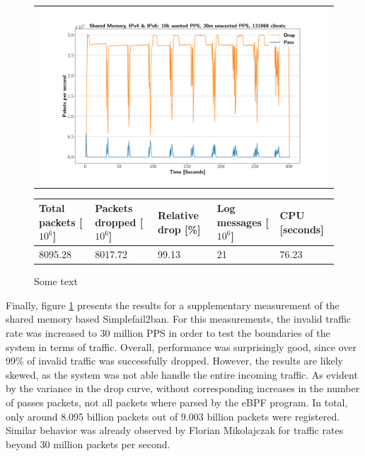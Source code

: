 \pagebreak

\begin{figure}[!h]
	\centering
	\scriptsize
	\begin{tabular}{c}
    	\centerline{\includegraphics[width=1.2\textwidth]{images/simplefail2ban_shm_ipv46_v10k_iv30m_c131068.png}}
	\end{tabular}
	\begin{tabular}{lllll}
		\toprule
		\textbf{Total packets [$10^6$]} & \textbf{Packets dropped [$10^6$]} & \textbf{Relative drop [\%]} & \textbf{Log messages [$10^6$]} & \textbf{CPU [seconds]} \\ \midrule 
		8095.28 & 8017.72 & 99.13 & 21 & 76.23 \\
		\bottomrule
	\end{tabular}
	\caption[Simplefail2ban, Shared Memory, IPv4 \& IPv6, 30m \ac{PPS}]{Some text}
	\label{fig:simplefail2ban:shm:ip46:30m}
\end{figure}

Finally, figure \ref{fig:simplefail2ban:shm:ip46:30m} presents the results for a supplementary measurement of the 
shared memory based Simplefail2ban. For this measurements, the invalid traffic rate was increased to 30 million \ac{PPS} in order to test the boundaries of the system in terms of traffic.  
Overall, performance was surprisingly good, since over 99\% of invalid traffic was successfully dropped. However, the results are likely skewed, as the system was not able handle
the entire incoming traffic. As evident by the variance in the drop curve, without corresponding increases in the number of passes packets, not all packets where parsed by the \ac{eBPF} program.
In total, only around 8.095 billion  packets out of 9.003 billion packets were registered. Similar behavior was already observed by Florian Mikolajczak \cite{mikolajczak2022} for traffic rates beyond
30 million packets per second.

